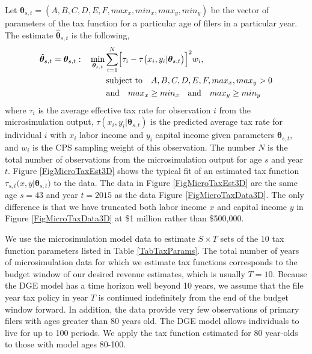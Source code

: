 \documentclass[letterpaper,12pt]{article}
\theoremstyle{definition}
\begin{document}
\begin{spacing}{1.5}
    Let $\bm{\theta}_{s,t}=(A,B,C,D,E,F,max_x,min_x,max_y,min_y)$ be the vector of parameters of the tax function for a particular age of filers in a particular year. The estimate $\bm{\hat{\theta}}_{s,t}$ is the following,
    \begin{equation}\label{EqThetaWSSQ}
      \begin{split}
        \bm{\hat{\theta}}_{s,t} = \bm{\theta}_{s,t}:\quad &\min_{\bm{\theta}_{s,t}}\sum_{i=1}^{N} \Bigl[\tau_{i}-\tau\bigl(x_i,y_i|\bm{\theta}_{s,t}\bigr)\Bigr]^{2} w_i, \\
        &\qquad\text{subject to}\quad A, B, C, D, E, F, max_x, max_y > 0 \\
        &\qquad\text{and}\quad max_{x}\geq min_x \quad\text{and}\quad max_{y}\geq min_y
      \end{split}
    \end{equation}
    where $\tau_{i}$ is the average effective tax rate for observation $i$ from the microsimulation output, $\tau(x_i,y_i|\bm{\theta}_{s,t})$ is the predicted average tax rate for individual $i$ with $x_{i}$ labor income and $y_{i}$ capital income given parameters $\bm{\theta}_{s,t}$, and $w_{i}$ is the CPS sampling weight of this observation. The number $N$ is the total number of observations from the microsimulation output for age $s$ and year $t$. Figure \ref{FigMicroTaxEst3D} shows the typical fit of an estimated tax function $\tau_{s,t}\bigl(x,y|\bm{\theta}_{s,t}\bigr)$ to the data. The data in Figure \ref{FigMicroTaxEst3D} are the same age $s=43$ and year $t=2015$ as the data Figure \ref{FigMicroTaxData3D}. The only difference is that we have truncated both labor income $x$ and capital income $y$ in Figure \ref{FigMicroTaxData3D} at \$1 million rather than \$500,000.

    We use the microsimulation model data to estimate $S\times T$ sets of the 10 tax function parameters listed in Table \ref{TabTaxParams}. The total number of years of microsimulation data for which we estimate tax functions corresponds to the budget window of our desired revenue estimates, which is usually $T=10$. Because the DGE model has a time horizon well beyond 10 years, we assume that the file year tax policy in year $T$ is continued indefinitely from the end of the budget window forward. In addition, the data provide very few observations of primary filers with ages greater than 80 years old. The DGE model allows individuals to live for up to 100 periods.  We apply the tax function estimated for 80 year-olds to those with model ages 80-100.



\end{spacing}
\end{document}
